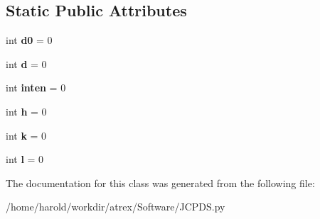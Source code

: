 \subsection*{Static Public Attributes}
\begin{DoxyCompactItemize}
\item 
\hypertarget{classJCPDS_1_1Reflection_a21cdd847ccc4a67939ba0f7eddb288b5}{int {\bfseries d0} = 0}\label{classJCPDS_1_1Reflection_a21cdd847ccc4a67939ba0f7eddb288b5}

\item 
\hypertarget{classJCPDS_1_1Reflection_a343546653e0fa7aa59c9ef63366d6d95}{int {\bfseries d} = 0}\label{classJCPDS_1_1Reflection_a343546653e0fa7aa59c9ef63366d6d95}

\item 
\hypertarget{classJCPDS_1_1Reflection_a0122c97dba87bbee7195978f098a6e77}{int {\bfseries inten} = 0}\label{classJCPDS_1_1Reflection_a0122c97dba87bbee7195978f098a6e77}

\item 
\hypertarget{classJCPDS_1_1Reflection_a9e23ae17c46a767f5b54e8c3f03e48f2}{int {\bfseries h} = 0}\label{classJCPDS_1_1Reflection_a9e23ae17c46a767f5b54e8c3f03e48f2}

\item 
\hypertarget{classJCPDS_1_1Reflection_acf1308b53630e8382c97b0d9ebb25bf3}{int {\bfseries k} = 0}\label{classJCPDS_1_1Reflection_acf1308b53630e8382c97b0d9ebb25bf3}

\item 
\hypertarget{classJCPDS_1_1Reflection_af56bfe0782709d77e267c57b198c3e0a}{int {\bfseries l} = 0}\label{classJCPDS_1_1Reflection_af56bfe0782709d77e267c57b198c3e0a}

\end{DoxyCompactItemize}


The documentation for this class was generated from the following file\-:\begin{DoxyCompactItemize}
\item 
/home/harold/workdir/atrex/\-Software/J\-C\-P\-D\-S.\-py\end{DoxyCompactItemize}

